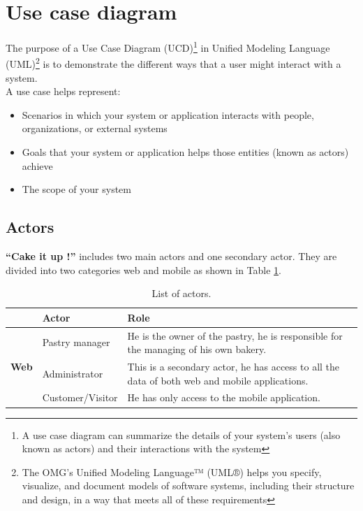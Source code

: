 \documentclass[12pt,a4paper]{report}
\begin{document}
	\section{Use case diagram}
	The purpose of a Use Case Diagram (UCD)\footnote{A use case diagram can summarize the details of your system's users (also known as actors) and their interactions with the system} in Unified Modeling Language (UML)\footnote{The OMG's Unified Modeling Language™ (UML®) helps you specify, visualize, and document models of software systems, including their structure and design, in a way that meets all of these requirements} is to demonstrate the different ways that a user might interact with a system.\\
	A use case helps represent: 
	
	\begin{itemize}
		\item 	Scenarios in which your system or application interacts with people, organizations, or external systems
		\item 	Goals that your system or application helps those entities (known as actors) achieve
		\item  	The scope of your system
	\end{itemize}
	
	\subsection{Actors}
	\textbf{``Cake it up !''} includes two main actors and one secondary actor. They are divided into two categories web and mobile as shown in Table \ref{table-actors}.
	\\
	\begin{table}[H]
		\begin{center}
			\caption{\label{table-actors} List of actors.} 
			\captionsetup[table]{skip=10pt}
			\setlength\doublerulesep{0.5pt}
			\begin{tabular}{|l|p{5cm}|p{8cm}| } 
				\hline\hline
				\rowcolor{LightCyan}
				& \textbf{Actor} & \textbf{Role}                                                                                 \\
				\hline
				\hline
				\multirow{3}{*}{\textbf{Web} }
				
				& Pastry manager & He is the owner of the pastry, he is responsible for the managing of his own bakery.          \\
				\cline{2-3}
				& Administrator  & This is a secondary actor, he has access to all the data of both web and mobile applications. \\
				\hline
				\hline
				\textbf{Mobile} & Customer/Visitor & He has only access to the mobile application.                                                 \\
				
				\hline
			\end{tabular}
		\end{center}
		
	\end{table}
	
\end{document}
